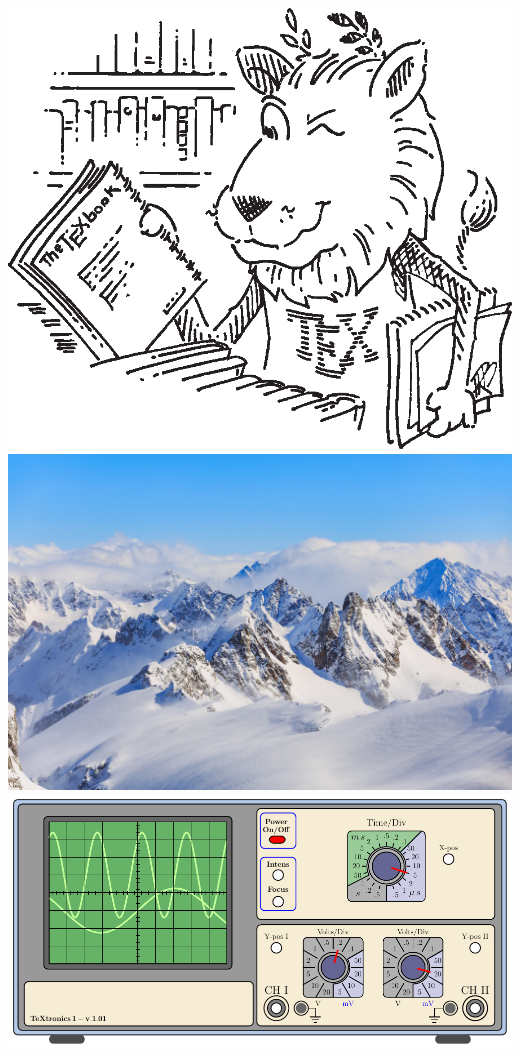\documentclass{ctexart}
\begin{document}
    \includegraphics[height=0.1\textheight]{lion}
    \includegraphics[height=0.1\textheight]{mountain}
    \includegraphics[height=0.1\textheight]{oscilloscope}
\end{document}
